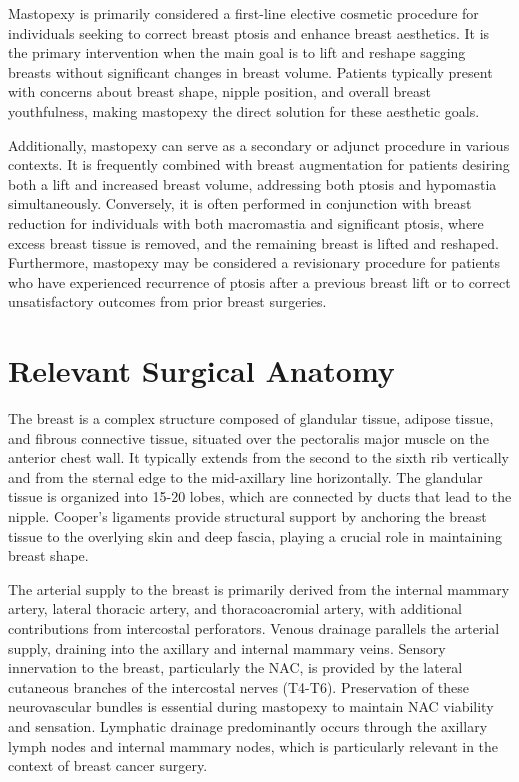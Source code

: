 Mastopexy is primarily considered a first-line elective cosmetic procedure for individuals seeking to correct breast ptosis and enhance breast aesthetics. It is the primary intervention when the main goal is to lift and reshape sagging breasts without significant changes in breast volume. Patients typically present with concerns about breast shape, nipple position, and overall breast youthfulness, making mastopexy the direct solution for these aesthetic goals.

Additionally, mastopexy can serve as a secondary or adjunct procedure in various contexts. It is frequently combined with breast augmentation for patients desiring both a lift and increased breast volume, addressing both ptosis and hypomastia simultaneously. Conversely, it is often performed in conjunction with breast reduction for individuals with both macromastia and significant ptosis, where excess breast tissue is removed, and the remaining breast is lifted and reshaped. Furthermore, mastopexy may be considered a revisionary procedure for patients who have experienced recurrence of ptosis after a previous breast lift or to correct unsatisfactory outcomes from prior breast surgeries.

\section*{Relevant Surgical Anatomy}
The breast is a complex structure composed of glandular tissue, adipose tissue, and fibrous connective tissue, situated over the pectoralis major muscle on the anterior chest wall. It typically extends from the second to the sixth rib vertically and from the sternal edge to the mid-axillary line horizontally. The glandular tissue is organized into 15-20 lobes, which are connected by ducts that lead to the nipple. Cooper's ligaments provide structural support by anchoring the breast tissue to the overlying skin and deep fascia, playing a crucial role in maintaining breast shape.

The arterial supply to the breast is primarily derived from the internal mammary artery, lateral thoracic artery, and thoracoacromial artery, with additional contributions from intercostal perforators. Venous drainage parallels the arterial supply, draining into the axillary and internal mammary veins. Sensory innervation to the breast, particularly the NAC, is provided by the lateral cutaneous branches of the intercostal nerves (T4-T6). Preservation of these neurovascular bundles is essential during mastopexy to maintain NAC viability and sensation. Lymphatic drainage predominantly occurs through the axillary lymph nodes and internal mammary nodes, which is particularly relevant in the context of breast cancer surgery.

